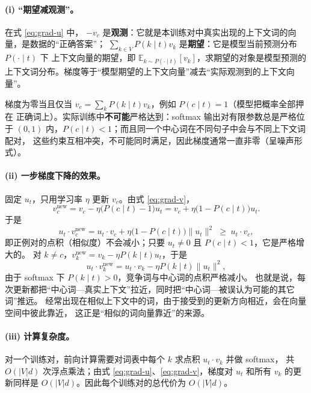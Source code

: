 \documentclass[11pt,a4paper]{article}
\begin{document}
\paragraph{(i) “期望减观测”。}
在式 \eqref{eq:grad-u} 中，
$-v_c$ 是\textbf{观测}：它就是本训练对中真实出现的上下文词的向量，是数据的“正确答案”；
$\sum_{k\in V}P(k\mid t)v_k$ 是\textbf{期望}：它是模型当前预测分布 $P(\cdot\mid t)$ 下
上下文向量的期望，即 $\mathbb{E}_{k\sim P(\cdot\mid t)}[v_k]$，求期望的对象是模型预测的
上下文词分布。梯度等于“模型期望的上下文向量”减去“实际观测到的上下文向量”。

梯度为零当且仅当 $v_c=\sum_k P(k\mid t)v_k$，例如 $P(c\mid t)=1$（模型把概率全部押在
正确词上）。实际训练中\textbf{不可能}严格达到：softmax 输出对有限参数总是严格位于
$(0,1)$ 内，$P(c\mid t)<1$；而且同一个中心词在不同句子中会与不同上下文词配对，
这些约束互相冲突，不可能同时满足，因此梯度通常一直非零（呈噪声形式）。

\paragraph{(ii) 一步梯度下降的效果。}
固定 $u_t$，只用学习率 $\eta$ 更新 $v_c$。由式 \eqref{eq:grad-v}，
\begin{equation}
v_c^{\text{new}}
=v_c-\eta\bigl(P(c\mid t)-1\bigr)u_t
=v_c+\eta\bigl(1-P(c\mid t)\bigr)u_t .
\end{equation}
于是
\begin{equation}
u_t\cdot v_c^{\text{new}}
=u_t\cdot v_c+\eta\bigl(1-P(c\mid t)\bigr)\lVert u_t\rVert^2
\;\ge\; u_t\cdot v_c ,
\end{equation}
即正例对的点积（相似度）不会减小；只要 $u_t\neq 0$ 且 $P(c\mid t)<1$，它是严格增大的。
对 $k\neq c$，$v_k^{\text{new}}=v_k-\eta P(k\mid t)u_t$，于是
\begin{equation}
u_t\cdot v_k^{\text{new}}
=u_t\cdot v_k-\eta P(k\mid t)\lVert u_t\rVert^2 ,
\end{equation}
由于 softmax 下 $P(k\mid t)>0$，竞争词与中心词的点积严格减小。
也就是说，每次更新都把“中心词—真实上下文”拉近，同时把“中心词—被误认为可能的其它词”推远。
经常出现在相似上下文中的词，由于接受到的更新方向相近，会在向量空间中彼此靠近，
这正是“相似的词向量靠近”的来源。

\paragraph{(iii) 计算复杂度。}
对一个训练对，前向计算需要对词表中每个 $k$ 求点积 $u_t\cdot v_k$ 并做 softmax，
共 $O(|V|d)$ 次浮点乘法；由式 \eqref{eq:grad-u}、\eqref{eq:grad-v}，梯度对
$u_t$ 和所有 $v_k$ 的更新同样是 $O(|V|d)$。因此每个训练对的总代价为 $O(|V|d)$。
\end{document}
